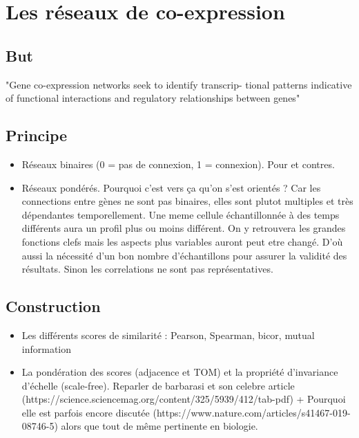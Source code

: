 

\section{Les réseaux de  co-expression}


\subsection{But}
"Gene co-expression networks seek to identify transcrip- tional patterns indicative of functional interactions and regulatory relationships between genes" %

\subsection{Principe}
\begin{itemize}
    \item Réseaux binaires (0 = pas de connexion, 1 = connexion). Pour et contres.
    \item Réseaux pondérés. Pourquoi c'est vers ça qu'on s'est orientés ? Car les connections entre gènes ne sont pas binaires, elles sont plutot multiples et très dépendantes temporellement. Une meme cellule échantillonnée à des temps différents aura un profil plus ou moins différent. On y retrouvera les grandes fonctions clefs mais les aspects plus variables auront peut etre changé. D'où aussi la nécessité d'un bon nombre d'échantillons pour assurer la validité des résultats. Sinon les correlations ne sont pas représentatives.
\end{itemize}
\subsection{Construction}
\begin{itemize}
\item Les différents scores de similarité : Pearson, Spearman, bicor, mutual information
\item La pondération des scores (adjacence et TOM) et la propriété d'invariance d'échelle (scale-free). Reparler de barbarasi et son celebre article (https://science.sciencemag.org/content/325/5939/412/tab-pdf) + Pourquoi elle est parfois encore discutée (https://www.nature.com/articles/s41467-019-08746-5) alors que tout de même pertinente en biologie. 
\end{itemize}
